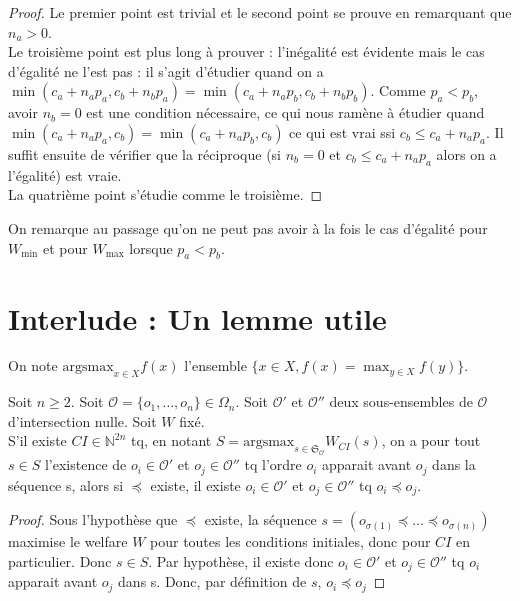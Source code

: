 \documentclass[a4paper]{article}
\newcommand{\N}{\mathbb{N}}
\newcommand{\Sg}{\mathfrak{S}}
\newcommand{\Oc}{\mathcal{O}}
\newcommand{\argsmax}{\mathrm{argsmax}}
\newtheorem[style=S, bodystyle=\noindent]{thm}{Théorème}[section]
\newtheorem[style=S, bodystyle=\noindent]{defn}[thm]{Définition}
\newtheorem[style=S, bodystyle=\noindent]{propo}[thm]{Proposition}
\newtheorem[style=S, bodystyle=\noindent]{prop}[thm]{Propriété}
\newtheorem[style=S, bodystyle=\noindent]{coro}[thm]{Corollaire}
\newtheorem[style=S, bodystyle=\noindent]{lem}[thm]{Lemme}
\newtheorem[style=S, headstyle=\bfseries\boldmath Théorème, bodystyle=\noindent]{thm*}{Théorème}
\newtheorem[style=S, headstyle=\bfseries\boldmath Définition, bodystyle=\noindent]{defn*}{Définition}
\newtheorem[style=S, headstyle=\bfseries\boldmath Proposition, bodystyle=\noindent]{propo*}{Proposition}
\newtheorem[style=S, headstyle=\bfseries\boldmath Propriété, bodystyle=\noindent]{prop*}{Propriété}
\newtheorem[style=S, headstyle=\bfseries\boldmath Corollaire, bodystyle=\noindent]{coro*}{Corollaire}
\newtheorem[style=S, headstyle=\bfseries\boldmath Lemme, bodystyle=\noindent]{lem*}{Lemme}
\begin{document}
\begin{proof}
Le premier point est trivial et le second point se prouve en remarquant que $n_a > 0$. \\
Le troisième point est plus long à prouver : l'inégalité est évidente mais le cas d'égalité ne l'est pas : il s'agit d'étudier quand on a $\min(c_a + n_ap_a, c_b + n_bp_a) = \min(c_a + n_ap_b, c_b + n_bp_b)$. Comme $p_a < p_b$, avoir $n_b = 0$ est une condition nécessaire, ce qui nous ramène à étudier quand $\min(c_a + n_ap_a, c_b) = \min(c_a + n_ap_b, c_b)$ ce qui est vrai ssi $c_b \leq c_a + n_ap_a$. Il suffit ensuite de vérifier que la réciproque (si $n_b = 0$ et $c_b \leq c_a + n_ap_a$ alors on a l'égalité) est vraie. \\
La quatrième point s'étudie comme le troisième.
\end{proof}

On remarque au passage qu'on ne peut pas avoir à la fois le cas d'égalité pour $W_{\min}$ et pour $W_{\max}$ lorsque $p_a < p_b$.

 \section{Interlude : Un lemme utile}

On note $\argsmax_{x\in X}f(x)$ l'ensemble $\{x \in X, f(x) = \max_{y\in X}f(y)\}$.

\begin{lem}
	\label{lem1}
	Soit $n \geq 2$. Soit $\Oc = \{o_1, \ldots, o_n\} \in \Omega_n$. Soit $\Oc'$ et $\Oc''$ deux sous-ensembles de $\Oc$ d'intersection nulle. Soit $W$ fixé.\\
	S'il existe $CI \in \N^{2n}$ tq, en notant $S = \argsmax_{s \in \Sg_\Oc}W_{CI}(s)$, on a pour tout $s \in S$ l'existence de $o_i\in\Oc'$ et $o_j\in\Oc''$ tq l'ordre $o_i$ apparait avant $o_j$ dans la séquence s, alors si $\preceq$ existe, il existe $o_i\in\Oc'$ et $o_j\in\Oc''$ tq $o_i \preceq o_j$.
\end{lem}

\begin{proof}
	Sous l'hypothèse que $\preceq$ existe, la séquence $s = (o_{\sigma(1)} \preceq \ldots \preceq o_{\sigma(n)})$ maximise le welfare $W$ pour toutes les conditions initiales, donc pour $CI$ en particulier. Donc $s \in S$. Par hypothèse, il existe donc $o_i \in \Oc'$ et $o_j \in \Oc''$ tq $o_i$ apparait avant $o_j$ dans s. Donc, par définition de $s$, $o_i \preceq o_j$
\end{proof}
\end{document}
